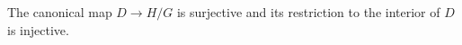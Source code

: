 The canonical map $D \rightarrow H/G$ is surjective and its restriction to the interior of $D$ is injective.
